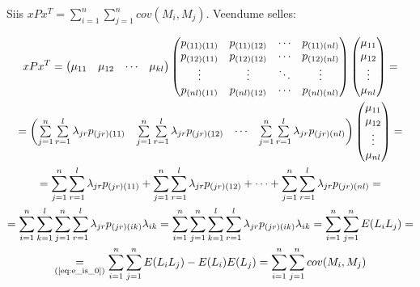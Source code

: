 \documentclass[a4paper,12pt,oneside]{article}
\newenvironment{tightcenter}{%
  \setlength\topsep{0pt}
  \setlength\parskip{0pt}
  \begin{center}
}{%
  \end{center}
}
\numberwithin{equation}{section}
\theoremstyle{definition}
\begin{document}
Siis $xPx^T = \sum \limits_{i=1}^n \sum \limits_{j=1}^n cov(M_i,M_j)$. Veendume selles:
\begin{tightcenter}
\begin{equation*}
\begin{gathered}
xPx^T =
\begin{pmatrix}
\mu_{11} & \mu_{12} & \cdots & \mu_{kl} 
\end{pmatrix}
\begin{pmatrix}
p_{(11)(11)}&p_{(11)(12)}&\cdots&p_{(11)(nl)} \\
p_{(12)(11)}&p_{(12)(12)}&\cdots&p_{(12)(nl)} \\
\vdots&\vdots&\ddots&\vdots \\
p_{(nl)(11)}&p_{(nl)(12)}&\cdots&p_{(nl)(nl)} \\
\end{pmatrix} 
\begin{pmatrix}
\mu_{11} \\
\mu_{12} \\
\vdots \\
\mu_{nl}
\end{pmatrix}
= \\
= 
\begin{pmatrix}
\sum \limits_{j=1}^n \sum \limits_{r=1}^l \lambda_{jr}p_{(jr)(11)} & \sum \limits_{j=1}^n \sum \limits_{r=1}^l \lambda_{jr}p_{(jr)(12)} & \cdots &  \sum \limits_{j=1}^n \sum \limits_{r=1}^l \lambda_{jr}p_{(jr)(nl)} \\
\end{pmatrix}
\begin{pmatrix}
\mu_{11} \\
\mu_{12} \\
\vdots \\
\mu_{nl}
\end{pmatrix}
=\\
=
\sum \limits_{j=1}^n \sum \limits_{r=1}^l \lambda_{jr}p_{(jr)(11)} + \sum \limits_{j=1}^n \sum \limits_{r=1}^l \lambda_{jr}p_{(jr)(12)} + \cdots +  \sum \limits_{j=1}^n \sum \limits_{r=1}^l \lambda_{jr}p_{(jr)(nl)}=\\
= \sum \limits_{i=1}^{n} \sum \limits_{k=1}^{l} \sum \limits_{j=1}^n \sum \limits_{r=1}^l \lambda_{jr}p_{(jr)(ik)} \lambda_{ik} 
= \sum \limits_{i=1}^{n}  \sum \limits_{j=1}^n \sum \limits_{k=1}^{l} \sum \limits_{r=1}^l \lambda_{jr}p_{(jr)(ik)} \lambda_{ik} =
\sum \limits_{i=1}^{n} \sum \limits_{j=1}^n E(L_iL_j) = \\
\underset{\text{(\ref{eq:e_is_0})}}{=} \sum \limits_{i=1}^{n} \sum \limits_{j=1}^n E(L_iL_j) - E(L_i)E(L_j) = \sum \limits_{i=1}^{n} \sum \limits_{j=1}^n cov(M_i,M_j)
\end{gathered}
\end{equation*}
\end{tightcenter}
\end{document}
